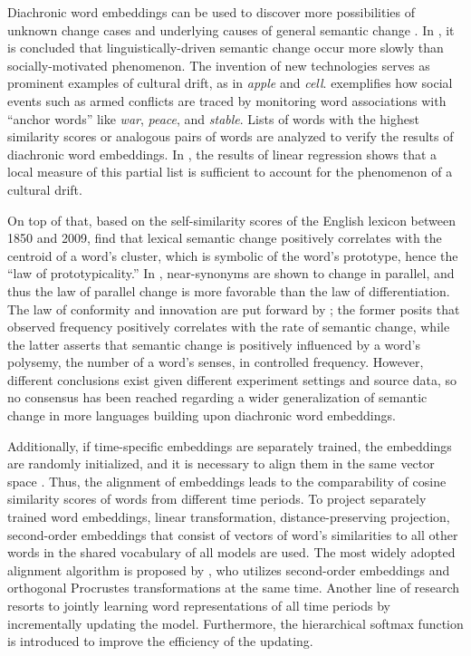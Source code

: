 Diachronic word embeddings can be used to discover more possibilities of unknown change cases and underlying causes of general semantic change \parencite{hamilton2016cultural,kutuzov2017tracing,heuser2017word}. In \textcite{hamilton2016cultural}, it is concluded that linguistically-driven semantic change occur more slowly than socially-motivated phenomenon. The invention of new technologies serves as prominent examples of cultural drift, as in \textit{apple} and \textit{cell}. \textcite{kutuzov2017tracing} exemplifies how social events such as armed conflicts are traced by monitoring word associations with ``anchor words'' like \textit{war}, \textit{peace}, and \textit{stable}. Lists of words with the highest similarity scores or analogous pairs of words are analyzed to verify the results of diachronic word embeddings. In \textcite{hamilton2016cultural}, the results of linear regression shows that a local measure of this partial list is sufficient to account for the phenomenon of a cultural drift.

On top of that, based on the self-similarity scores of the English lexicon between 1850 and 2009, \textcite{dubossarsky2015bottom} find that lexical semantic change positively correlates with the centroid of a word's cluster, which is symbolic of the word's prototype, hence the ``law of prototypicality.'' In \textcite{xu2015computational}, near-synonyms are shown to change in parallel, and thus the law of parallel change is more favorable than the law of differentiation. The law of conformity and innovation are put forward by \textcite{hamilton2016law}; the former posits that observed frequency positively correlates with the rate of semantic change, while the latter asserts that semantic change is positively influenced by a word's polysemy, the number of a word's senses, in controlled frequency. However, different conclusions exist given different experiment settings and source data, so no consensus has been reached regarding a wider generalization of semantic change in more languages building upon diachronic word embeddings.%

Additionally, if time-specific embeddings are separately trained, the embeddings are randomly initialized, and it is necessary to align them in the same vector space \parencite{hamilton2016law}. Thus, the alignment of embeddings leads to the comparability of cosine similarity scores of words from different time periods. To project separately trained word embeddings, linear transformation, distance-preserving projection, second-order embeddings that consist of vectors of word's similarities to all other words in the shared vocabulary of all models are used. The most widely adopted alignment algorithm is proposed by \textcite{hamilton2016law}, who utilizes second-order embeddings and orthogonal Procrustes transformations at the same time. Another line of research resorts to jointly learning word representations of all time periods by incrementally updating the model. Furthermore, the hierarchical softmax function is introduced to improve the efficiency of the updating.

